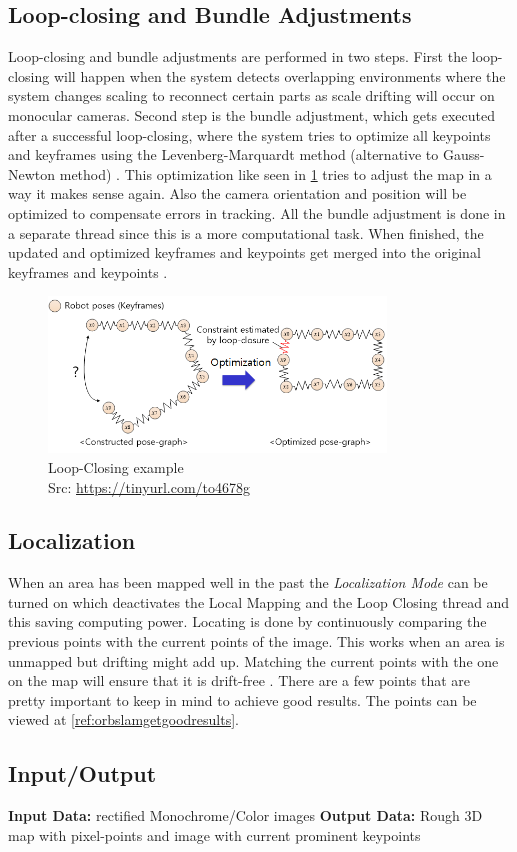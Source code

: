 \subsection{Loop-closing and Bundle Adjustments}
Loop-closing and bundle adjustments are performed in two steps. First the loop-closing will happen when the system detects overlapping environments where the system changes scaling to reconnect certain parts as scale drifting will occur on monocular cameras.\newline
Second step is the bundle adjustment, which gets executed after a successful loop-closing, where the system tries to optimize all keypoints and keyframes using the Levenberg-Marquardt method (alternative to Gauss-Newton method) \cite{LevenbergMarquardMethod}. This optimization like seen in \ref{img:loopclosing} tries to adjust the map in a way it makes sense again.  Also the camera orientation and position will be optimized to compensate errors in tracking. All the bundle adjustment is done in a separate thread since this is a more computational task.\newline
When finished, the updated and optimized keyframes and keypoints get merged into the original keyframes and keypoints \cite{orbslam2}.\newline
\begin{figure}[h!]
	\centering
	\includegraphics[width=0.8\textwidth]{./media/images/loopclosing.PNG}
  	\caption{Loop-Closing example
  	\\Src: \url{https://tinyurl.com/to4678g}}
  	\label{img:loopclosing}
\end{figure}

\subsection {Localization}
When an area has been mapped well in the past the \textit{Localization Mode} can be turned on which deactivates the Local Mapping and the Loop Closing thread and this saving computing power.
Locating is done by continuously comparing the previous points with the current points of the image. This works when an area is unmapped but drifting might add up.
Matching the current points with the one on the map will ensure that it is drift-free \cite{orbslam2}. There are a few points that are pretty important to keep in mind to achieve good results. The points can be viewed at \ref{ref:orbslamgetgoodresults}.

\subsection{Input/Output}
\textbf{Input Data:} rectified Monochrome/Color images\newline
\textbf{Output Data:} Rough 3D map with pixel-points and image with current prominent keypoints